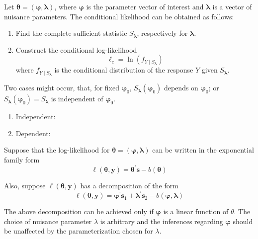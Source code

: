Let $\boldsymbol{\theta}=(\boldsymbol{\varphi},\boldsymbol{\lambda})$, where $\boldsymbol{\varphi}$ is the parameter vector of interest and $\boldsymbol{\lambda}$ is a vector of nuisance parameters. The conditional likelihood can be obtained as follows:
\begin{enumerate}
	\item Find the complete sufficient statistic $S_{\boldsymbol{\lambda}}$, respectively for $\boldsymbol{\lambda}$.
	\item  Construct the conditional log-likelihood
	      \begin{equation}
		      \ell_{c}=\ln\left(f_{Y\mid S_{\boldsymbol{\lambda}}}\right)
	      \end{equation}
	      where $f_{Y\mid S_{\boldsymbol{\lambda}}}$ is the conditional distribution of the response $Y$ given $S_{\boldsymbol{\lambda}}$.
\end{enumerate}

\begin{remark}
	Two cases might occur, that, for fixed $\boldsymbol{\varphi}_{0}$, $S_{\boldsymbol{\lambda}}\left(\boldsymbol{\varphi}_{0}\right)$ depends on $\boldsymbol{\varphi}_{0}$; or $S_{\boldsymbol{\lambda}}\left(\boldsymbol{\varphi}_{0}\right)=S_{\boldsymbol{\lambda}}$ is independent of $\boldsymbol{\varphi}_{0}$.
	\begin{enumerate}
		\item Independent:
		\item Dependent:
	\end{enumerate}
\end{remark}

Suppose that the log-likelihood for $\boldsymbol{\theta}=\left(\boldsymbol{\varphi},\boldsymbol{\lambda}\right)$ can be written in the exponential family form
\begin{equation}
	\ell\left(\boldsymbol{\theta},\mathbf{y}\right)=\boldsymbol{\theta}^{\prime}\mathbf{s}-b\left(\boldsymbol{\theta}\right)
\end{equation}

Also, suppose $\ell\left(\boldsymbol{\theta},\mathbf{y}\right)$ has a decomposition of the form
\begin{equation}
	\ell\left(\boldsymbol{\theta},\mathbf{y}\right)=\boldsymbol{\varphi}^{\prime}\mathbf{s}_{1}+\boldsymbol{\lambda}^{\prime}\mathbf{s}_{2}-b(\boldsymbol{\varphi},\boldsymbol{\lambda})
\end{equation}

\begin{remark}
	The above decomposition can be achieved only if $\boldsymbol{\varphi}$ is a linear function of $\theta$. The choice of nuisance parameter $\lambda$ is arbitrary and the inferences regarding $\boldsymbol{\varphi}$ should be unaffected by the parameterization chosen for $\lambda$.
\end{remark}


